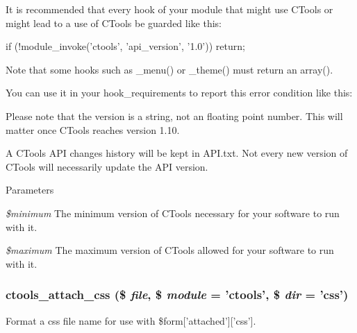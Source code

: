 It is recommended that every hook of your module that might use CTools or might lead to a use of CTools be guarded like this:


\begin{DoxyCode}
 if (!module_invoke('ctools', 'api_version', '1.0')) {
   return;
 }
\end{DoxyCode}


Note that some hooks such as \_\-menu() or \_\-theme() must return an array().

You can use it in your hook\_\-requirements to report this error condition like this:




Please note that the version is a string, not an floating point number. This will matter once CTools reaches version 1.10.

A CTools API changes history will be kept in API.txt. Not every new version of CTools will necessarily update the API version. 
\begin{DoxyParams}{Parameters}
\item[{\em \$minimum}]The minimum version of CTools necessary for your software to run with it. \item[{\em \$maximum}]The maximum version of CTools allowed for your software to run with it. \end{DoxyParams}
\hypertarget{ctools_8module_ac92693fc61e852535e2ff6adecd1d44d}{
\subsubsection[{ctools\_\-attach\_\-css}]{\setlength{\rightskip}{0pt plus 5cm}ctools\_\-attach\_\-css (\$ {\em file}, \/  \$ {\em module} = {\ttfamily 'ctools'}, \/  \$ {\em dir} = {\ttfamily 'css'})}}
\label{ctools_8module_ac92693fc61e852535e2ff6adecd1d44d}
Format a css file name for use with \$form\mbox{[}'attached'\mbox{]}\mbox{[}'css'\mbox{]}.

